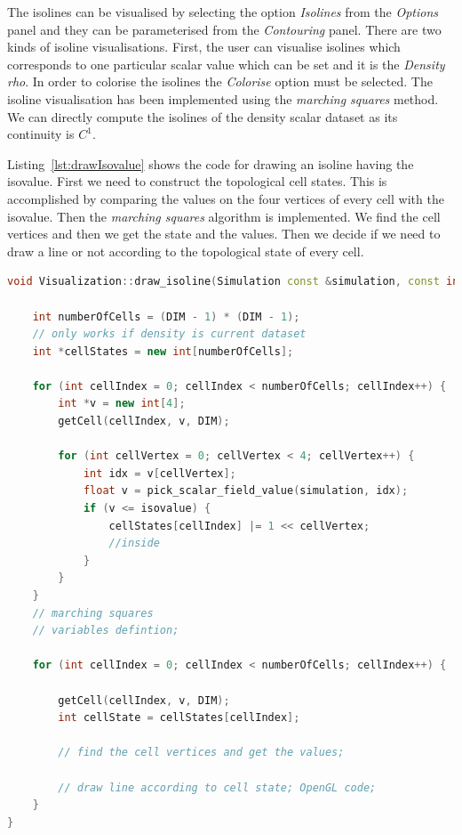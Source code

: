 
The isolines can be visualised by selecting the option \emph{Isolines} from the \emph{Options} panel and they can be parameterised from the \emph{Contouring} panel. There are two kinds of isoline visualisations. First, the user can visualise isolines which corresponds to one particular scalar value which can be set and it is the \emph{Density rho}. In order to colorise the isolines the \emph{Colorise} option must be selected. The isoline visualisation has been implemented using the \emph{marching squares} method. We can directly compute the isolines of the density scalar dataset as its continuity is $C^1$. 

Listing~\ref{lst:drawIsovalue} shows the code for drawing an isoline having the isovalue. First we need to construct the topological cell states. This is accomplished by comparing the values on the four vertices of every cell with the isovalue. Then the \emph{marching squares} algorithm is implemented. We find the cell vertices and then we get the state and the values. Then we decide if we need to draw a line  or not according to the topological state of every cell.

\begin{lstlisting}[language=C++,label=lst:drawIsovalue,caption={Draw isoline given an isovalue.}]
void Visualization::draw_isoline(Simulation const &simulation, const int DIM, const fftw_real wn, const fftw_real hn, float isovalue) {

    int numberOfCells = (DIM - 1) * (DIM - 1);
    // only works if density is current dataset
    int *cellStates = new int[numberOfCells];

    for (int cellIndex = 0; cellIndex < numberOfCells; cellIndex++) {
        int *v = new int[4];
        getCell(cellIndex, v, DIM);

        for (int cellVertex = 0; cellVertex < 4; cellVertex++) {
            int idx = v[cellVertex];
            float v = pick_scalar_field_value(simulation, idx);
            if (v <= isovalue) {
                cellStates[cellIndex] |= 1 << cellVertex;
                //inside
            }
        }
    }
    // marching squares      
    // variables defintion;

    for (int cellIndex = 0; cellIndex < numberOfCells; cellIndex++) {
    
        getCell(cellIndex, v, DIM);
        int cellState = cellStates[cellIndex];

        // find the cell vertices and get the values;

        // draw line according to cell state; OpenGL code;
    }
}
\end{lstlisting}

